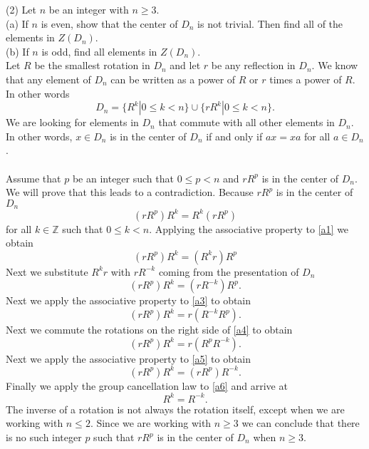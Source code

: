 \documentclass[11pt,a4paper]{article}
\begin{document}
(2) Let $n$ be an integer with $n \geq 3$.\\
(a) If $n$ is even, show that the center of $D_n$ is not trivial. Then find all of the elements in $Z(D_n)$.\\
(b) If $n$ is odd, find all elements in $Z(D_n)$.\\
Let $R$ be the smallest rotation in $D_n$ and let $r$ be any reflection in $D_n$. We know that any element of $D_n$ can be written as a power of $R$ or $r$ times a power of $R$. In other words
\[D_n = \{ R^k | 0 \leq k < n \} \cup \{ rR^k | 0 \leq k < n \}.\]
We are looking for elements in $D_n$ that commute with all other elements in $D_n$. In other words, $x\in D_n$ is in the center of $D_n$ if and only if $ax = xa$ for all $a \in D_n$.\\
~\\
Assume that $p$ be an integer such that $0 \leq p < n$ and $rR^p$ is in the center of $D_n$. We will prove that this leads to a contradiction. Because $rR^p$ is in the center of $D_n$
\begin{equation}\label{a1}
(rR^p)R^k = R^k(rR^p)
\end{equation}
for all $k\in \mathbb{Z}$ such that $0 \leq k < n$. Applying the associative property to \eqref{a1} we obtain
\begin{equation}
(rR^p)R^k = (R^kr)R^p
\end{equation}
Next we substitute $R^kr$ with $rR^{-k}$ coming from the presentation of $D_n$
\begin{equation}\label{a3}
(rR^p)R^k = (rR^{-k})R^p.
\end{equation}
Next we apply the associative property to \eqref{a3} to obtain
\begin{equation}\label{a4}
(rR^p)R^k = r(R^{-k}R^p).
\end{equation}
Next we commute the rotations on the right side of \eqref{a4} to obtain
\begin{equation}\label{a5}
(rR^p)R^k = r(R^pR^{-k}).
\end{equation}
Next we apply the associative property to \eqref{a5} to obtain
\begin{equation}\label{a6}
(rR^p)R^k = (rR^p)R^{-k}.
\end{equation}
Finally we apply the group cancellation law to \eqref{a6} and arrive at
\[R^k = R^{-k}.\]
The inverse of a rotation is not always the rotation itself, except when we are working with $n\leq 2$. Since we are working with $n \geq 3$ we can conclude that there is no such integer $p$ such that $rR^p$ is in the center of $D_n$ when $n \geq 3$.\\
\end{document}
